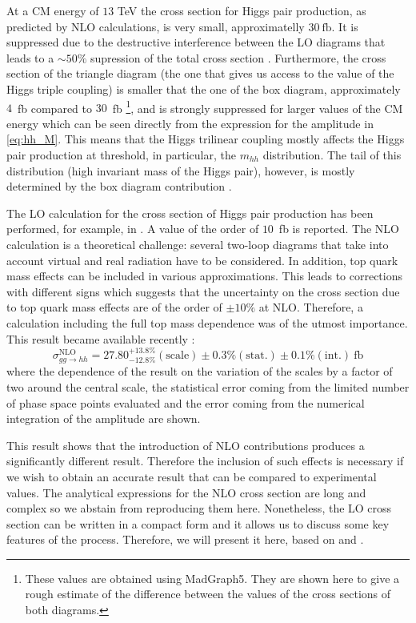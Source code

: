 At a CM energy of $13$ TeV the cross section for Higgs pair production, as predicted by NLO calculations, is very small, approximatelly $30~\text{fb}$. It is suppressed due to the destructive interference between the LO diagrams that leads to a $\sim 50\%$ supression of the total cross section \cite{FCCyellow}. Furthermore, the cross section of the triangle diagram (the one that gives us access to the value of the Higgs triple coupling) is smaller that the one of the box diagram, approximately $4$~fb compared to $30$~fb \footnote{These values are obtained using MadGraph5. They are shown here to give a rough estimate of the difference between the values of the cross sections  of both diagrams.}, and is strongly suppressed for larger values of the CM energy which can be seen directly from the expression for the amplitude in \ref{eq:hh_M}. This means that the Higgs trilinear coupling mostly affects the Higgs pair production at threshold, in particular, the $m_{hh}$ distribution. The tail of this distribution (high invariant mass of the Higgs pair), however, is mostly determined by the box diagram contribution \cite{FCCyellow}.  

The LO calculation for the cross section of Higgs pair production has been performed, for example, in \cite{HHxs_LO}. A value of the order of $10$~fb is reported. The NLO calculation is a theoretical challenge: several two-loop diagrams that take into account virtual and real radiation have to be considered. In addition, top quark mass effects can be included in various approximations. This leads to corrections with different signs which suggests that the uncertainty on the cross section due to top quark mass effects are of the order of $\pm 10\%$ at NLO. Therefore, a calculation including the full top mass dependence was of the utmost importance. This result became available recently \cite{HHcalc_top}:
\begin{equation}
\sigma^{\text{NLO}}_{gg\rightarrow hh} = 27.80^{+13.8\%}_{-12.8\%}(\text{scale})\pm 0.3\%(\text{stat.})\pm 0.1\% (\text{int.})~\text{fb}
\end{equation}
where the dependence of the result on the variation of the scales by a factor of two around the central scale, the statistical error coming from the limited number of phase space points evaluated and the error coming from the numerical integration of the amplitude are shown. 

This result shows that the introduction of NLO contributions produces a significantly different result. Therefore the inclusion of such effects is necessary if we wish to obtain an accurate result that can be compared to experimental values. The analytical expressions for the NLO cross section are long and complex so we abstain from reproducing them here. Nonetheless, the LO cross section can be written in a compact form and it allows us to discuss some key features of the process. Therefore, we will present it here, based on \cite{HHxs_LO} and \cite{HHxs_LO1}.

